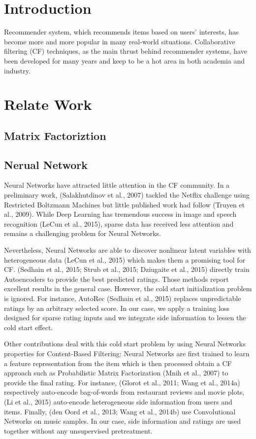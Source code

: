 \documentclass{sig-alternate-05-2015}
\begin{document}
\section{Introduction}
Recommender system, which recommends items based on users’ interests, has become more and more popular in many real-world situations.
Collaborative filtering (CF) techniques, as the main thrust behind recommender systems, have been developed for many years and keep to be a hot area in both academia and industry.

\section{Relate Work}
\subsection{Matrix Factoriztion}


\subsection{Nerual Network}
Neural Networks have attracted little attention in the CF community.
In a preliminary work, (Salakhutdinov et al., 2007) tackled the Netflix challenge using Restricted Boltzmann Machines but little published work had follow (Truyen et al., 2009).
While Deep Learning has tremendous success in image and speech recognition (LeCun
et al., 2015), sparse data has received less attention and remains a challenging problem for Neural Networks.

Nevertheless, Neural Networks are able to discover nonlinear latent variables with heterogeneous data (LeCun et al., 2015) which makes them a promising tool for CF.
(Sedhain et al., 2015; Strub et al., 2015; Dziugaite et al., 2015) directly train Autoencoders to provide the best predicted ratings.
Those methods report excellent results in the general case.
However, the cold start initialization problem is ignored.
For instance, AutoRec (Sedhain et al., 2015) replaces unpredictable ratings by an arbitrary selected score.
In our case, we apply a training loss designed for sparse rating inputs and we integrate side information to lessen the cold start effect.

Other contributions deal with this cold start problem by using Neural Networks properties for Content-Based Filtering: Neural Networks are first trained to learn a feature representation from the item which is then processed obtain a CF approach such as Probabilistic Matrix Factorization (Mnih et al., 2007) to provide the final rating.
For instance, (Glorot et al., 2011; Wang et al., 2014a) respectively auto-encode bag-of-words from restaurant reviews and movie plots, (Li et al., 2015) auto-encode heterogeneous side information from users and items.
Finally, (den Oord et al., 2013; Wang et al., 2014b) use Convolutional Networks on music samples.
In our case, side information and ratings are used together without any unsupervised
pretreatment.
\end{document}
